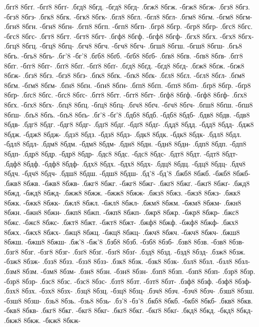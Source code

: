 {.бгґ8 8бгґ. -бгґ8 8бгґ-
.бгд8 8бгд. -бгд8 8бгд-
.бгж8 8бгж. -бгж8 8бгж-
.бгз8 8бгз. -бгз8 8бгз-
.бгк8 8бгк. -бгк8 8бгк-
.бгл8 8бгл. -бгл8 8бгл-
.бгм8 8бгм. -бгм8 8бгм-
.бгн8 8бгн. -бгн8 8бгн-
.бгп8 8бгп. -бгп8 8бгп-
.бгр8 8бгр. -бгр8 8бгр-
.бгс8 8бгс. -бгс8 8бгс-
.бгт8 8бгт. -бгт8 8бгт-
.бгф8 8бгф. -бгф8 8бгф-
.бгх8 8бгх. -бгх8 8бгх-
.бгц8 8бгц. -бгц8 8бгц-
.бгч8 8бгч. -бгч8 8бгч-
.бгш8 8бгш. -бгш8 8бгш-
.бгь8 8бгь. -бгь8 8бгь-
.бг'8 -бг'8
.бґб8 8бґб. -бґб8 8бґб-
.бґв8 8бґв. -бґв8 8бґв-
.бґг8 8бґг. -бґг8 8бґг-
.бґґ8 8бґґ. -бґґ8 8бґґ-
.бґд8 8бґд. -бґд8 8бґд-
.бґж8 8бґж. -бґж8 8бґж-
.бґз8 8бґз. -бґз8 8бґз-
.бґк8 8бґк. -бґк8 8бґк-
.бґл8 8бґл. -бґл8 8бґл-
.бґм8 8бґм. -бґм8 8бґм-
.бґн8 8бґн. -бґн8 8бґн-
.бґп8 8бґп. -бґп8 8бґп-
.бґр8 8бґр. -бґр8 8бґр-
.бґс8 8бґс. -бґс8 8бґс-
.бґт8 8бґт. -бґт8 8бґт-
.бґф8 8бґф. -бґф8 8бґф-
.бґх8 8бґх. -бґх8 8бґх-
.бґц8 8бґц. -бґц8 8бґц-
.бґч8 8бґч. -бґч8 8бґч-
.бґш8 8бґш. -бґш8 8бґш-
.бґь8 8бґь. -бґь8 8бґь-
.бґ'8 -бґ'8
.бдб8 8бдб. -бдб8 8бдб-
.бдв8 8бдв. -бдв8 8бдв-
.бдг8 8бдг. -бдг8 8бдг-
.бдґ8 8бдґ. -бдґ8 8бдґ-
.бдд8 8бдд. -бдд8 8бдд-
.бдж8 8бдж. -бдж8 8бдж-
.бдз8 8бдз. -бдз8 8бдз-
.бдк8 8бдк. -бдк8 8бдк-
.бдл8 8бдл. -бдл8 8бдл-
.бдм8 8бдм. -бдм8 8бдм-
.бдн8 8бдн. -бдн8 8бдн-
.бдп8 8бдп. -бдп8 8бдп-
.бдр8 8бдр. -бдр8 8бдр-
.бдс8 8бдс. -бдс8 8бдс-
.бдт8 8бдт. -бдт8 8бдт-
.бдф8 8бдф. -бдф8 8бдф-
.бдх8 8бдх. -бдх8 8бдх-
.бдц8 8бдц. -бдц8 8бдц-
.бдч8 8бдч. -бдч8 8бдч-
.бдш8 8бдш. -бдш8 8бдш-
.бд'8 -бд'8
.бжб8 8бжб. -бжб8 8бжб-
.бжв8 8бжв. -бжв8 8бжв-
.бжг8 8бжг. -бжг8 8бжг-
.бжґ8 8бжґ. -бжґ8 8бжґ-
.бжд8 8бжд. -бжд8 8бжд-
.бжж8 8бжж. -бжж8 8бжж-
.бжз8 8бжз. -бжз8 8бжз-
.бжк8 8бжк. -бжк8 8бжк-
.бжл8 8бжл. -бжл8 8бжл-
.бжм8 8бжм. -бжм8 8бжм-
.бжн8 8бжн. -бжн8 8бжн-
.бжп8 8бжп. -бжп8 8бжп-
.бжр8 8бжр. -бжр8 8бжр-
.бжс8 8бжс. -бжс8 8бжс-
.бжт8 8бжт. -бжт8 8бжт-
.бжф8 8бжф. -бжф8 8бжф-
.бжх8 8бжх. -бжх8 8бжх-
.бжц8 8бжц. -бжц8 8бжц-
.бжч8 8бжч. -бжч8 8бжч-
.бжш8 8бжш. -бжш8 8бжш-
.бж'8 -бж'8
.бзб8 8бзб. -бзб8 8бзб-
.бзв8 8бзв. -бзв8 8бзв-
.бзг8 8бзг. -бзг8 8бзг-
.бзґ8 8бзґ. -бзґ8 8бзґ-
.бзд8 8бзд. -бзд8 8бзд-
.бзж8 8бзж. -бзж8 8бзж-
.бзз8 8бзз. -бзз8 8бзз-
.бзк8 8бзк. -бзк8 8бзк-
.бзл8 8бзл. -бзл8 8бзл-
.бзм8 8бзм. -бзм8 8бзм-
.бзн8 8бзн. -бзн8 8бзн-
.бзп8 8бзп. -бзп8 8бзп-
.бзр8 8бзр. -бзр8 8бзр-
.бзс8 8бзс. -бзс8 8бзс-
.бзт8 8бзт. -бзт8 8бзт-
.бзф8 8бзф. -бзф8 8бзф-
.бзх8 8бзх. -бзх8 8бзх-
.бзц8 8бзц. -бзц8 8бзц-
.бзч8 8бзч. -бзч8 8бзч-
.бзш8 8бзш. -бзш8 8бзш-
.бзь8 8бзь. -бзь8 8бзь-
.бз'8 -бз'8
.бкб8 8бкб. -бкб8 8бкб-
.бкв8 8бкв. -бкв8 8бкв-
.бкг8 8бкг. -бкг8 8бкг-
.бкґ8 8бкґ. -бкґ8 8бкґ-
.бкд8 8бкд. -бкд8 8бкд-
.бкж8 8бкж. -бкж8 8бкж-
}
